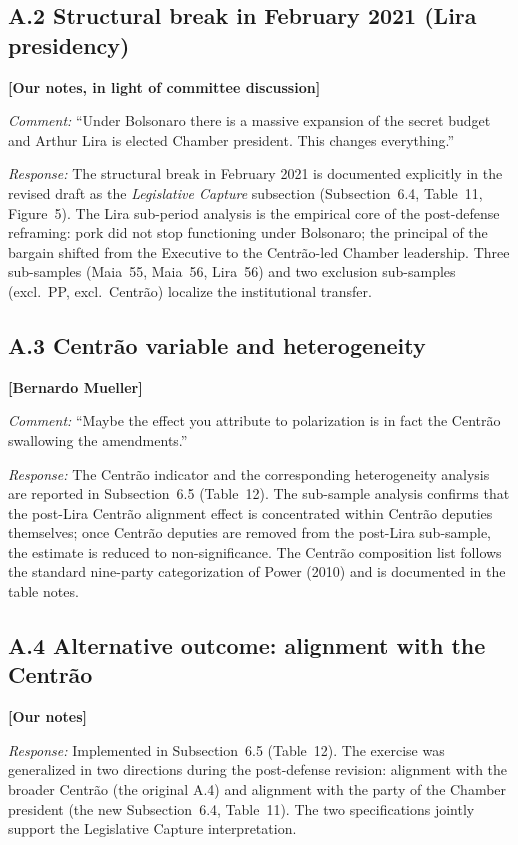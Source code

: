 \documentclass[11pt]{article}
\newcommand{\committee}[1]{\textbf{[#1]}}
\begin{document}
\subsection*{A.2 \quad Structural break in February 2021 (Lira presidency)}
\committee{Our notes, in light of committee discussion}

\noindent\emph{Comment:} ``Under Bolsonaro there is a massive expansion of the
secret budget and Arthur Lira is elected Chamber president. This changes
everything.''

\noindent\emph{Response:} The structural break in February 2021 is documented
explicitly in the revised draft as the \emph{Legislative Capture}
subsection (Subsection~6.4, Table~11, Figure~5). The Lira sub-period
analysis is the empirical core of the post-defense reframing: pork did
not stop functioning under Bolsonaro; the principal of the bargain
shifted from the Executive to the Centrão-led Chamber leadership.
Three sub-samples (Maia~55, Maia~56, Lira~56) and two exclusion
sub-samples (excl.~PP, excl.~Centrão) localize the institutional
transfer.

\subsection*{A.3 \quad Centrão variable and heterogeneity}
\committee{Bernardo Mueller}

\noindent\emph{Comment:} ``Maybe the effect you attribute to polarization is
in fact the Centrão swallowing the amendments.''

\noindent\emph{Response:} The Centrão indicator and the corresponding
heterogeneity analysis are reported in Subsection~6.5 (Table~12). The
sub-sample analysis confirms that the post-Lira Centrão alignment
effect is concentrated within Centrão deputies themselves; once
Centrão deputies are removed from the post-Lira sub-sample, the
estimate is reduced to non-significance. The Centrão composition list
follows the standard nine-party categorization of Power (2010)
and is documented in the table notes.

\subsection*{A.4 \quad Alternative outcome: alignment with the Centrão}
\committee{Our notes}

\noindent\emph{Response:} Implemented in Subsection~6.5 (Table~12). The
exercise was generalized in two directions during the post-defense
revision: alignment with the broader Centrão (the original A.4) and
alignment with the party of the Chamber president (the new
Subsection~6.4, Table~11). The two specifications jointly support the
Legislative Capture interpretation.
\end{document}
